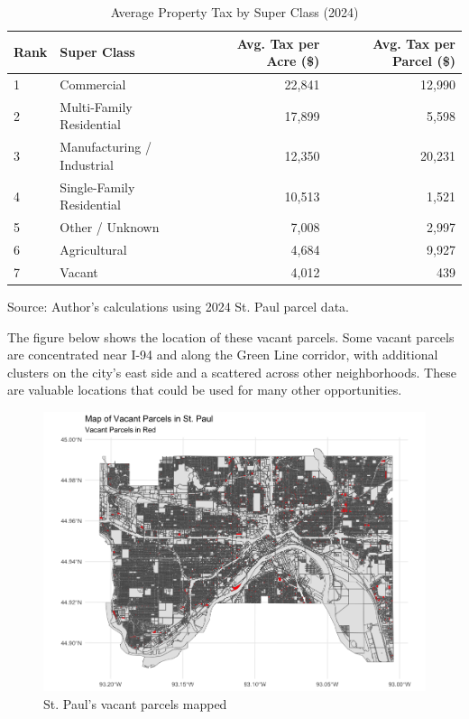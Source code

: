 \documentclass[12pt]{article}
\begin{document}
\begin{table}[h!]
\centering
\caption{Average Property Tax by Super Class (2024)}
\begin{tabular}{llrr}
\toprule
\textbf{Rank} & \textbf{Super Class} & \textbf{Avg. Tax per Acre (\$)} & \textbf{Avg. Tax per Parcel (\$)} \\
\midrule
1 & Commercial & 22{,}841 & 12{,}990 \\
2 & Multi-Family Residential & 17{,}899 & 5{,}598 \\
3 & Manufacturing / Industrial & 12{,}350 & 20{,}231 \\
4 & Single-Family Residential & 10{,}513 & 1{,}521 \\
5 & Other / Unknown & 7{,}008 & 2{,}997 \\
6 & Agricultural & 4{,}684 & 9{,}927 \\
7 & Vacant & 4{,}012 & 439 \\
\bottomrule
\end{tabular}
\parbox{\linewidth}{\raggedright\footnotesize Source: Author’s calculations using 2024 St. Paul parcel data.}
\end{table}


The figure below shows the location of these vacant parcels. Some vacant parcels are concentrated near I-94 and along the Green Line corridor, with additional clusters on the city’s east side and a scattered across other neighborhoods. These are valuable locations that could be used for many other opportunities.

\begin{figure}[H]
    \centering
    \includegraphics[width=0.9\linewidth]{Map of Vacant Parcels in St. Paul.png}
    \caption{St. Paul's vacant parcels mapped}
\end{figure}
\end{document}
